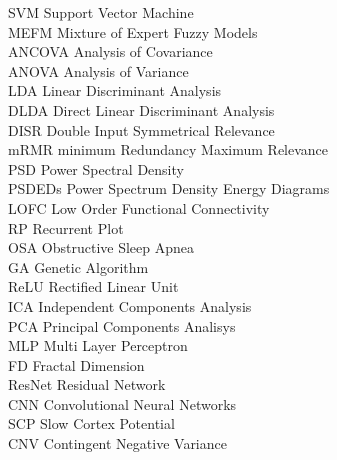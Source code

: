 \documentclass[letterpaper,12pt,openright,oneside]{article}
\begin{document}
SVM    Support Vector Machine\\

MEFM   Mixture of Expert Fuzzy Models\\

ANCOVA Analysis of Covariance\\

ANOVA  Analysis of Variance\\

LDA    Linear Discriminant Analysis\\

DLDA   Direct Linear Discriminant Analysis\\

DISR   Double Input Symmetrical Relevance\\

mRMR   minimum Redundancy Maximum Relevance\\

PSD    Power Spectral Density\\

PSDEDs Power Spectrum Density Energy Diagrams\\

LOFC   Low Order Functional Connectivity\\

RP 	   Recurrent Plot\\ 	

OSA    Obstructive Sleep Apnea\\

GA     Genetic Algorithm\\

ReLU   Rectified Linear Unit\\

ICA	   Independent Components Analysis\\

PCA    Principal Components Analisys\\

MLP    Multi Layer Perceptron\\

FD     Fractal Dimension \\

ResNet Residual Network\\

CNN    Convolutional Neural Networks\\

SCP    Slow Cortex Potential\\

CNV    Contingent Negative Variance \\
\end{document}
